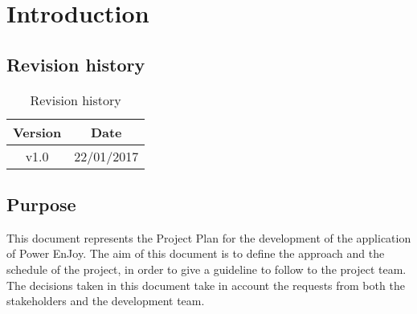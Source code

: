 \chapter{Introduction}

\section{Revision history}
\begin{table}[!h]
\centering
\caption{Revision history}
\label{my-label}
\begin{tabular}{|c|c|}
\hline
Version & Date       \\ \hline
v1.0    & 22/01/2017 \\ \hline
\end{tabular}
\end{table}

\section{Purpose}
This document represents the Project Plan for the development of the application of Power EnJoy. The aim of this document is to define the approach and the schedule of the project, in order to give a guideline to follow to the project team.
The decisions taken in this document take in account the requests from both the stakeholders and the development team.

